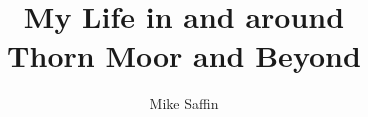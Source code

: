 \documentclass[twoside,11pt,a5paper]{memoir}
\title{My Life in and around\\Thorn Moor and Beyond}
\author{Mike Saffin}
\date{}
\begin{document}


\maketitle

\chapter{}

\chapter{}

\chapter{}

\chapter{}

\chapter{}

\chapter{}


\clearpage


\chapter{}

\chapter{}

\chapter{}

\chapter{}

\chapter{}

\chapter{}

\end{document}
